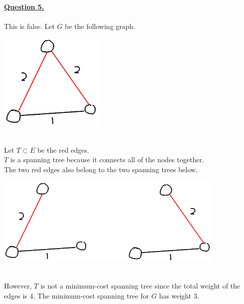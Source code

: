\documentclass[12pt]{article}
\begin{document}
\newpage
\noindent \hyperlink{toc}{\hypertarget{5}{\LARGE \underline{\textbf{Question 5.}}}}
\\\\
This is false.
Let $G$ be the following graph.
\begin{center}
	\includegraphics[width=5cm]{CSCB63_A2_5-1.png}
\end{center}\ \\
Let $T \subset E$ be the red edges.\\
$T$ is a spanning tree because it connects all of the nodes together.\\
The two red edges also belong to the two spanning trees below.
\begin{center}
	\includegraphics[width=11cm]{CSCB63_A2_5-2.png}
\end{center}\ \\
However, $T$ is not a minimum-cost spanning tree since the total weight of the edges is 4. The minimum-cost spanning tree for $G$ has weight 3.
\end{document}
